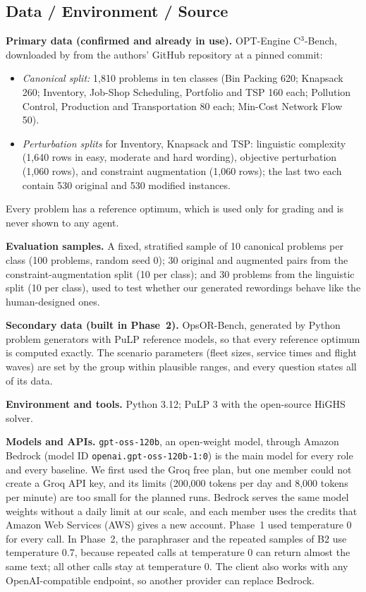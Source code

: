 \documentclass[11pt,a4paper]{article}
\newcommand{\cthree}{C$^3$-Bench}
\begin{document}
\subsection{Data / Environment / Source}
\label{sec:data}

\textbf{Primary data (confirmed and already in use).} OPT-Engine \cthree, downloaded by  from the authors' GitHub repository at a pinned commit:
\begin{itemize}[leftmargin=1.6em]
\item \textit{Canonical split:} 1,810 problems in ten classes (Bin Packing 620; Knapsack 260; Inventory, Job-Shop Scheduling, Portfolio and TSP 160 each; Pollution Control, Production and Transportation 80 each; Min-Cost Network Flow 50).
\item \textit{Perturbation splits} for Inventory, Knapsack and TSP: linguistic complexity (1,640 rows in easy, moderate and hard wording), objective perturbation (1,060 rows), and constraint augmentation (1,060 rows); the last two each contain 530 original and 530 modified instances.
\end{itemize}
Every problem has a reference optimum, which is used only for grading and is never shown to any agent.

\textbf{Evaluation samples.} A fixed, stratified sample of 10 canonical problems per class (100 problems, random seed 0); 30 original and augmented pairs from the constraint-augmentation split (10 per class); and 30 problems from the linguistic split (10 per class), used to test whether our generated rewordings behave like the human-designed ones.

\textbf{Secondary data (built in Phase~2).} OpsOR-Bench, generated by Python problem generators with PuLP reference models, so that every reference optimum is computed exactly. The scenario parameters (fleet sizes, service times and flight waves) are set by the group within plausible ranges, and every question states all of its data.

\textbf{Environment and tools.} Python 3.12; PuLP 3 with the open-source HiGHS solver.

\textbf{Models and APIs.} \texttt{gpt-oss-120b}, an open-weight model, through Amazon Bedrock (model ID \texttt{openai.gpt-oss-120b-1:0}) is the main model for every role and every baseline. We first used the Groq free plan, but one member could not create a Groq API key, and its limits (200,000 tokens per day and 8,000 tokens per minute) are too small for the planned runs. Bedrock serves the same model weights without a daily limit at our scale, and each member uses the credits that Amazon Web Services (AWS) gives a new account. Phase~1 used temperature 0 for every call. In Phase~2, the paraphraser and the repeated samples of B2 use temperature 0.7, because repeated calls at temperature 0 can return almost the same text; all other calls stay at temperature 0. The client also works with any OpenAI-compatible endpoint, so another provider can replace Bedrock.
\end{document}
